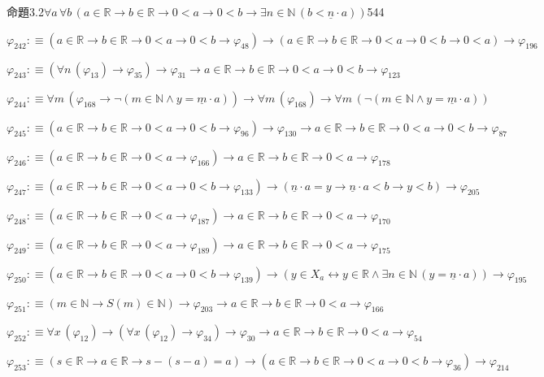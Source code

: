 \begin{fullproof}{命題3.2}{$\forall a\,\forall b\,(a \in \mathbb{R} \to b \in \mathbb{R} \to 0 < a \to 0 < b \to \exists n \in \mathbb{N}\,(b < \underline{n} \cdot a))$}{544}
\begin{abbrevlist}
\item $\varphi_{242} :\equiv (a \in \mathbb{R} \to b \in \mathbb{R} \to 0 < a \to 0 < b \to \varphi_{48}) \to (a \in \mathbb{R} \to b \in \mathbb{R} \to 0 < a \to 0 < b \to 0 < a) \to \varphi_{196}$
\item $\varphi_{243} :\equiv (\forall n\,(\varphi_{13}) \to \varphi_{35}) \to \varphi_{31} \to a \in \mathbb{R} \to b \in \mathbb{R} \to 0 < a \to 0 < b \to \varphi_{123}$
\item $\varphi_{244} :\equiv \forall m\,(\varphi_{168} \to \neg (m \in \mathbb{N} \land y = \underline{m} \cdot a)) \to \forall m\,(\varphi_{168}) \to \forall m\,(\neg (m \in \mathbb{N} \land y = \underline{m} \cdot a))$
\item $\varphi_{245} :\equiv (a \in \mathbb{R} \to b \in \mathbb{R} \to 0 < a \to 0 < b \to \varphi_{96}) \to \varphi_{130} \to a \in \mathbb{R} \to b \in \mathbb{R} \to 0 < a \to 0 < b \to \varphi_{87}$
\item $\varphi_{246} :\equiv (a \in \mathbb{R} \to b \in \mathbb{R} \to 0 < a \to \varphi_{166}) \to a \in \mathbb{R} \to b \in \mathbb{R} \to 0 < a \to \varphi_{178}$
\item $\varphi_{247} :\equiv (a \in \mathbb{R} \to b \in \mathbb{R} \to 0 < a \to 0 < b \to \varphi_{133}) \to (\underline{n} \cdot a = y \to \underline{n} \cdot a < b \to y < b) \to \varphi_{205}$
\item $\varphi_{248} :\equiv (a \in \mathbb{R} \to b \in \mathbb{R} \to 0 < a \to \varphi_{187}) \to a \in \mathbb{R} \to b \in \mathbb{R} \to 0 < a \to \varphi_{170}$
\item $\varphi_{249} :\equiv (a \in \mathbb{R} \to b \in \mathbb{R} \to 0 < a \to \varphi_{189}) \to a \in \mathbb{R} \to b \in \mathbb{R} \to 0 < a \to \varphi_{175}$
\item $\varphi_{250} :\equiv (a \in \mathbb{R} \to b \in \mathbb{R} \to 0 < a \to 0 < b \to \varphi_{139}) \to (y \in X_{a} \leftrightarrow y \in \mathbb{R} \land \exists n \in \mathbb{N}\,(y = \underline{n} \cdot a)) \to \varphi_{195}$
\item $\varphi_{251} :\equiv (m \in \mathbb{N} \to S(m) \in \mathbb{N}) \to \varphi_{203} \to a \in \mathbb{R} \to b \in \mathbb{R} \to 0 < a \to \varphi_{166}$
\item $\varphi_{252} :\equiv \forall x\,(\varphi_{12}) \to (\forall x\,(\varphi_{12}) \to \varphi_{34}) \to \varphi_{30} \to a \in \mathbb{R} \to b \in \mathbb{R} \to 0 < a \to \varphi_{54}$
\item $\varphi_{253} :\equiv (s \in \mathbb{R} \to a \in \mathbb{R} \to s - (s - a) = a) \to (a \in \mathbb{R} \to b \in \mathbb{R} \to 0 < a \to 0 < b \to \varphi_{36}) \to \varphi_{214}$

\end{abbrevlist}
\end{fullproof}

